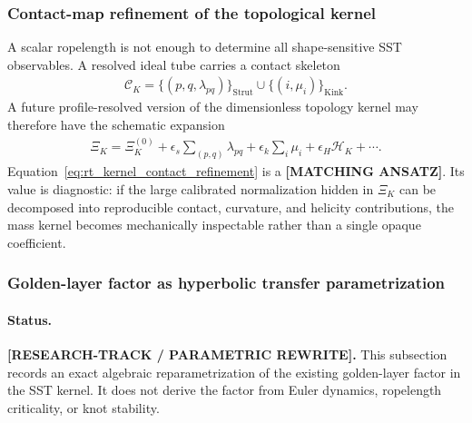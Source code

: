 \subsubsection{Contact-map refinement of the topological kernel}
A scalar ropelength is not enough to determine all shape-sensitive SST
observables.  A resolved ideal tube carries a contact skeleton
\begin{align}
    \mathcal C_K
    =
    \bigl\{(p,q,\lambda_{pq})\bigr\}_{\operatorname{Strut}}
    \cup
    \bigl\{(i,\mu_i)\bigr\}_{\operatorname{Kink}} .
    \label{eq:rt_contact_skeleton}
\end{align}
A future profile-resolved version of the dimensionless topology kernel may
therefore have the schematic expansion
\begin{align}
    \Xi_K
    =
    \Xi_K^{(0)}
    +\epsilon_s\sum_{(p,q)}\lambda_{pq}
    +\epsilon_k\sum_i\mu_i
    +\epsilon_H\mathcal H_K
    +\cdots .
    \label{eq:rt_kernel_contact_refinement}
\end{align}
Equation~\eqref{eq:rt_kernel_contact_refinement} is a
\textbf{[MATCHING ANSATZ]}.  Its value is diagnostic: if the large calibrated
normalization hidden in $\Xi_K$ can be decomposed into reproducible contact,
curvature, and helicity contributions, the mass kernel becomes mechanically
inspectable rather than a single opaque coefficient.

\subsubsection{Golden-layer factor as hyperbolic transfer parametrization}
\paragraph{Status.}
\textbf{[RESEARCH-TRACK / PARAMETRIC REWRITE].}
This subsection records an exact algebraic reparametrization of the
existing golden-layer factor in the SST kernel.  It does not derive the
factor from Euler dynamics, ropelength criticality, or knot stability.

